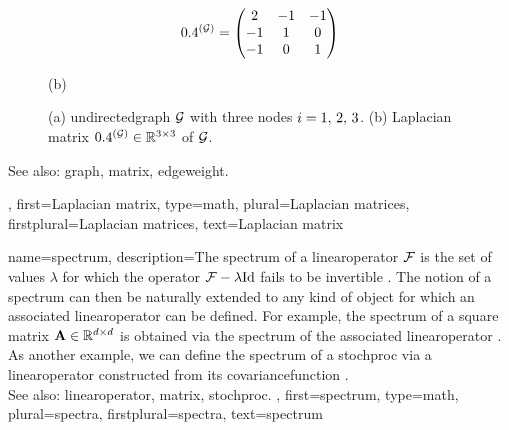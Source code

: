 {{\begin{figure}[H]
\begin{center}
\begin{minipage}{0.45\textwidth}
	 	\end{minipage} 
	 	\hspace*{-15mm}
 		\begin{minipage}{0.45\textwidth}
	 			 \begin{equation} 
	 				 0.4^{(\mathcal{G})} = \begin{pmatrix} 2 & -1& -1 \\ -1& 1 & 0 \\  -1 & 0 & 1 \end{pmatrix}  
	 				 \nonumber
	 			\end{equation} 
				\begin{minipage}{\textwidth}
				\vspace{3.5ex}
				\centering
				{\selectfont (b)}
				\end{minipage}
	 	\end{minipage}
	 	\caption{\label{fig_lap_mtx_dict} (a) \Gls{undirectedgraph} $\mathcal{G}$ with three nodes $i=1,\,2,\,3$. 
	 		 (b) Laplacian \gls{matrix} $0.4^{(\mathcal{G})}  \in \mathbb{R}^{3 \times 3}$ of $\mathcal{G}$.} 
	 	\end{center}
	 	\end{figure}
		See also: \gls{graph}, \gls{matrix}, \gls{edgeweight}.},
	first={Laplacian matrix},
	type=math,
	plural={Laplacian matrices},
	firstplural={Laplacian matrices},
	text={Laplacian matrix}
}

{name={spectrum},
	description={The spectrum of a \gls{linearoperator} $\mathcal{F}$ 
  		is the set of values $\lambda$ for which the \gls{operator}
  		$\mathcal{F} - \lambda \mathrm{Id}$ fails to be invertible \cite{Muller2003}. 
  		The notion of a spectrum can then be naturally extended to any kind of 
		object for which an associated \gls{linearoperator} can be defined. 
		For example, the spectrum of a square \gls{matrix} ${\bf A} \in \mathbb{R}^{d \times d}$ 
  		is obtained via the spectrum of the associated \gls{linearoperator} \cite{Horn91}.
  		As another example, we can define the spectrum of a \gls{stochproc} via a  
		\gls{linearoperator} constructed from its \gls{covariancefunction} \cite{Rasmussen2006Gaussian}.
		\\
		See also: \gls{linearoperator}, \gls{matrix}, \gls{stochproc}. },
	first={spectrum},
	type=math,
	plural={spectra},
	firstplural={spectra},
	text={spectrum}
}

